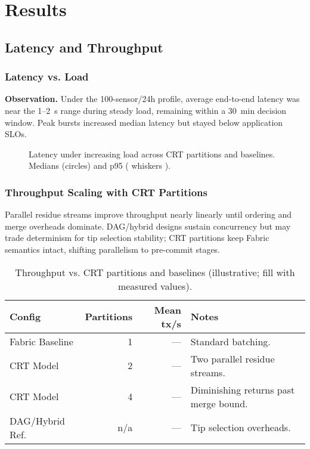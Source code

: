 \section{Results}

\subsection{Latency and Throughput}

\subsubsection{Latency vs. Load}
\textbf{Observation.} Under the 100-sensor/24h profile, average end-to-end latency was near the 1–2~s range during steady load, remaining within a 30~min decision window. Peak bursts increased median latency but stayed below application SLOs.\ %
\begin{figure}[!t]
  \centering
  \caption{Latency under increasing load across CRT partitions and baselines. Medians (circles) and p95 ( whiskers ).}
  \label{fig:latency-load}
\end{figure}

\subsubsection{Throughput Scaling with CRT Partitions}
Parallel residue streams improve throughput nearly linearly until ordering and merge overheads dominate. DAG/hybrid designs sustain concurrency but may trade determinism for tip selection stability; CRT partitions keep Fabric semantics intact, shifting parallelism to pre-commit stages.
\begin{table}[!t]
  \centering
  \caption{Throughput vs. CRT partitions and baselines (illustrative; fill with measured values).}
  \label{tab:throughput-crt}
  \begin{tabular}{lrrl}
    \toprule
    Config & Partitions & Mean tx/s & Notes \\
    \midrule
    Fabric Baseline & 1 & --- & Standard batching. \\
    CRT Model & 2 & --- & Two parallel residue streams. \\
    CRT Model & 4 & --- & Diminishing returns past merge bound. \\
    DAG/Hybrid Ref. & n/a & --- & Tip selection overheads. \\
    \bottomrule
  \end{tabular}
\end{table}

